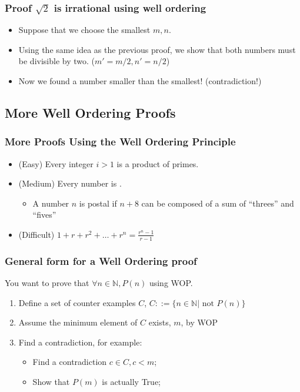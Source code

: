 \documentclass{beamer}
\begin{document}
\begin{frame}
  \frametitle{Proof $\sqrt{2}$ is irrational using well ordering}
  \begin{itemize}
  \item Suppose that we choose the \alert{smallest} $m,n$.
    \bigskip
    
  \item Using the same idea as the previous proof, we show that both
    numbers must be divisible by two. ($m' = m/2, n' = n/2$)
    \bigskip
    
  \item Now we found a number \alert{smaller than the smallest! (contradiction!)}
  \end{itemize}
\end{frame}

\subsection{More Well Ordering Proofs}
\begin{frame}
  \frametitle{More Proofs Using the Well Ordering Principle}

  \begin{itemize}
  \item (Easy) Every integer $i > 1$ is a product of primes.

    \bigskip
    
  \item (Medium) Every number is .
    \begin{itemize}
    \item A number $n$ is postal if $n+8$ can be composed of a sum of
      ``threes'' and ``fives''
    \end{itemize}

    \bigskip

  \item (Difficult) $1 + r + r^2 + \ldots + r^n = \frac{r^n-1}{r-1}$
  \end{itemize}
\end{frame}

\begin{frame}
  \frametitle{General form for a Well Ordering proof}
  You want to prove that $\forall n \in \mathbb{N}, P(n)$ using WOP.
  
  \begin{enumerate}
  \item Define a set of counter examples $C$, $C ::=\{n \in
    \mathbb{N}|\text{ not } P(n)\}$
  \item Assume the minimum element of $C$ exists, $m$, by WOP
  \item Find a contradiction, for example:
    \begin{itemize}
    \item Find a contradiction $c \in C, c < m$;
    \item Show that $P(m)$ is actually True;
    \end{itemize}
    
  \end{enumerate}
\end{frame}
\end{document}
